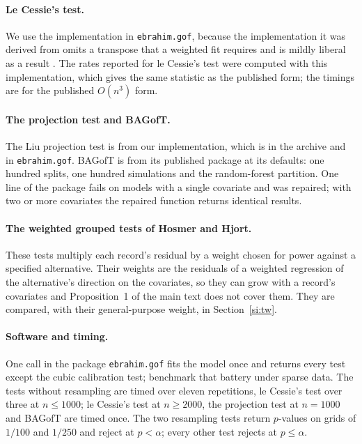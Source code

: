 \documentclass[11pt]{article}
\begin{document}
\paragraph{Le Cessie's test.} We use the implementation in \texttt{ebrahim.gof}, because the
implementation it was derived from omits a transpose that a weighted fit requires and is mildly liberal
as a result \citep{ebrahim2026benchmark}. The rates reported for le Cessie's test were computed with
this implementation, which gives the same statistic as the published form; the timings are for the
published $O(n^3)$ form.

\paragraph{The projection test and BAGofT.} The Liu projection test is from our implementation, which
is in the archive and in \texttt{ebrahim.gof}. BAGofT is from its published package at its defaults:
one hundred splits, one hundred simulations and the random-forest partition. One line of the package
fails on models with a single covariate and was repaired; with two or more covariates the repaired
function returns identical results.

\paragraph{The weighted grouped tests of Hosmer and Hjort.} These tests multiply each record's
residual by a weight chosen for power against a specified alternative. Their weights are the residuals
of a weighted regression of the alternative's direction on the covariates, so they can grow with a
record's covariates and Proposition~1 of the main text does not cover them. They are compared, with
their general-purpose weight, in Section~\ref{si:tw}.

\paragraph{Software and timing.} One call in the package \texttt{ebrahim.gof} fits the model once
and returns every test except the cubic calibration test;
\citet{ebrahim2026benchmark} benchmark that battery under sparse data. The tests without resampling are
timed over eleven repetitions, le Cessie's test over three at $n\le1000$; le Cessie's test at
$n\ge2000$, the projection test at $n=1000$ and BAGofT are timed once. The two resampling tests return
$p$-values on grids of $1/100$ and $1/250$ and reject at $p<\alpha$; every other test rejects at
$p\le\alpha$.
\end{document}
